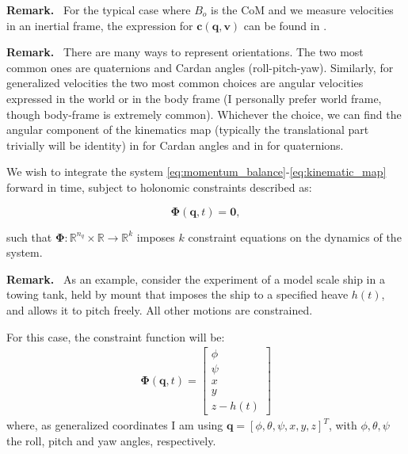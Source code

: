 \documentclass{article}
\newcommand{\mf}[1]{{\mathbf{#1}}}
\newenvironment{remark}{\begin{remarkbox}\textbf{Remark.}~}{\end{remarkbox}}
\begin{document}
\begin{remark}
For the typical case where $B_o$ is the CoM and we measure velocities in an
inertial frame, the expression for $\mf{c}(\mf{q}, \mf{v})$ can be found in
\cite[\S 2.3.1]{bib:jain2010_robot_multibody_dynamics}.
\end{remark}

\begin{remark}
There are many ways to represent orientations. The two most common ones are
quaternions and Cardan angles (roll-pitch-yaw). Similarly, for generalized
velocities the two most common choices are angular velocities expressed in the
world or in the body frame (I personally prefer world frame, though body-frame
is extremely common). Whichever the choice, we can find the angular component of
the kinematics map (typically the translational part trivially will be identity)
in \cite[\S 5.6]{bib:diebel2006} for Cardan angles and in \cite[\S
6.6]{bib:diebel2006} for quaternions.
\end{remark}

We wish to integrate the system
\eqref{eq:momentum_balance}-\eqref{eq:kinematic_map} forward in time, subject to
holonomic constraints described as:

\begin{equation}
    \mf{\Phi}(\mf{q}, t) = \mf{0},
\end{equation}

such that $\mf{\Phi}: \mathbb{R}^{n_q} \times \mathbb{R} \rightarrow \mathbb{R}^k$
imposes $k$ constraint equations on the dynamics of the system.

\begin{remark}
As an example, consider the experiment of a model scale ship in a towing tank,
held by mount that imposes the ship to a specified heave $h(t)$, and allows it
to pitch freely. All other motions are constrained.

For this case, the constraint function will be:
\begin{eqnarray*}
    \mf{\Phi}(\mf{q}, t) = \begin{bmatrix}
        \phi\\
        \psi\\
        x\\
        y\\
        z - h(t)
    \end{bmatrix}  
\end{eqnarray*}
where, as generalized coordinates I am using $\mf{q}=[\phi, \theta, \psi,
x, y, z]^T$, with $\phi, \theta, \psi$ the roll, pitch and yaw angles,
respectively.

\end{remark}    
\end{document}
